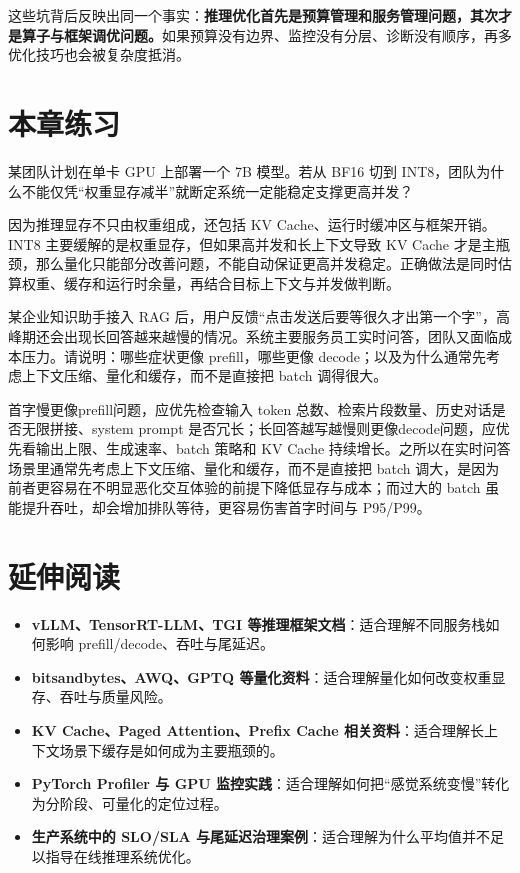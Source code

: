 这些坑背后反映出同一个事实：\textbf{推理优化首先是预算管理和服务管理问题，其次才是算子与框架调优问题。}如果预算没有边界、监控没有分层、诊断没有顺序，再多优化技巧也会被复杂度抵消。

\section{本章练习}
\begin{exercise}[推理显存粗估]
某团队计划在单卡 GPU 上部署一个 7B 模型。若从 BF16 切到 INT8，团队为什么不能仅凭“权重显存减半”就断定系统一定能稳定支撑更高并发？
\end{exercise}

\begin{solution}
因为推理显存不只由权重组成，还包括 KV Cache、运行时缓冲区与框架开销。INT8 主要缓解的是权重显存，但如果高并发和长上下文导致 KV Cache 才是主瓶颈，那么量化只能部分改善问题，不能自动保证更高并发稳定。正确做法是同时估算权重、缓存和运行时余量，再结合目标上下文与并发做判断。
\end{solution}

\begin{exercise}[阶段诊断与实时取舍]
某企业知识助手接入 RAG 后，用户反馈“点击发送后要等很久才出第一个字”，高峰期还会出现长回答越来越慢的情况。系统主要服务员工实时问答，团队又面临成本压力。请说明：哪些症状更像 prefill，哪些更像 decode；以及为什么通常先考虑上下文压缩、量化和缓存，而不是直接把 batch 调得很大。
\end{exercise}

\begin{solution}
首字慢更像{\heiti prefill}问题，应优先检查输入 token 总数、检索片段数量、历史对话是否无限拼接、system prompt 是否冗长；长回答越写越慢则更像{\heiti decode}问题，应优先看输出上限、生成速率、batch 策略和 KV Cache 持续增长。之所以在实时问答场景里通常先考虑上下文压缩、量化和缓存，而不是直接把 batch 调大，是因为前者更容易在不明显恶化交互体验的前提下降低显存与成本；而过大的 batch 虽能提升吞吐，却会增加排队等待，更容易伤害首字时间与 P95/P99。
\end{solution}

\section{延伸阅读}
\begin{itemize}
  \item \textbf{vLLM、TensorRT-LLM、TGI 等推理框架文档}：适合理解不同服务栈如何影响 prefill/decode、吞吐与尾延迟。
  \item \textbf{bitsandbytes、AWQ、GPTQ 等量化资料}：适合理解量化如何改变权重显存、吞吐与质量风险。
  \item \textbf{KV Cache、Paged Attention、Prefix Cache 相关资料}：适合理解长上下文场景下缓存是如何成为主要瓶颈的。
  \item \textbf{PyTorch Profiler 与 GPU 监控实践}：适合理解如何把“感觉系统变慢”转化为分阶段、可量化的定位过程。
  \item \textbf{生产系统中的 SLO/SLA 与尾延迟治理案例}：适合理解为什么平均值并不足以指导在线推理系统优化。
\end{itemize}

